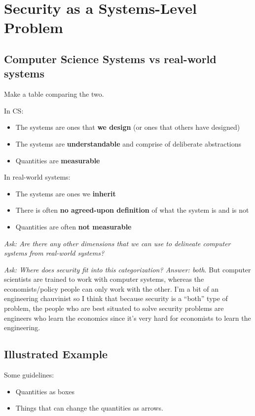 \documentclass[11pt]{article}
\begin{document}
\section{Security as a Systems-Level Problem}

\subsection{Computer Science Systems vs real-world systems}

Make a table comparing the two.

In CS:
\begin{itemize}
    \item The systems are ones that {\bf we design} (or ones that others have designed)
    \item The systems are {\bf understandable} and comprise of deliberate abstractions
    \item Quantities are {\bf measurable}
\end{itemize}

In real-world systems:
\begin{itemize}
    \item The systems are ones we {\bf inherit}
    \item There is often {\bf no agreed-upon definition} of what the system is and is not
    \item Quantities are often {\bf not measurable}
\end{itemize}

{\it Ask: Are there any other dimensions that we can use to delineate computer systems from real-world systems?}

{\it Ask: Where does security fit into this categorization? Answer: both}. But computer scientists are trained to work with computer systems, whereas the economists/policy people can only work with the other. I'm a bit of an engineering chauvinist so I think that because security is a ``both'' type of problem, the people who are best situated to solve security problems are engineers who learn the economics since it's very hard for economists to learn the engineering.

\subsection{Illustrated Example}
Some guidelines:
\begin{itemize}
    \item Quantities as boxes
    \item Things that can change the quantities as arrows.
\end{itemize}
\end{document}

